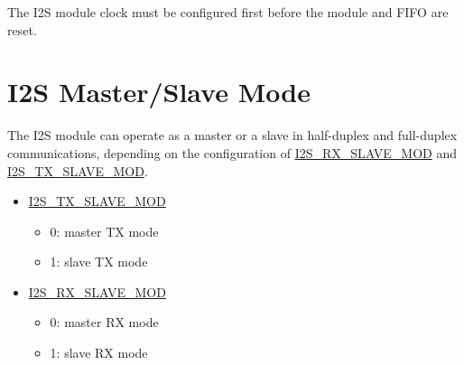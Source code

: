 \documentclass[main\_\_EN.tex]{subfiles}
\begin{document}
\begin{tiplisting}
The I2S module clock must be configured first before the module and FIFO are reset.
\end{tiplisting} 

\section{I2S Master/Slave Mode}

The \chipname{} I2S module can operate as a master or a slave in half-duplex and full-duplex communications, depending on the configuration of  \hyperref[fielddesc:I2SRXSLAVEMOD]{I2S\_RX\_SLAVE\_MOD} and  \hyperref[fielddesc:I2STXSLAVEMOD]{I2S\_TX\_SLAVE\_MOD}.

\begin{itemize}
    \item \hyperref[fielddesc:I2STXSLAVEMOD]{I2S\_TX\_SLAVE\_MOD} 
    \begin{itemize}
        \item 0: master TX mode
        \item 1: slave TX mode
    \end{itemize}
    \item \hyperref[fielddesc:I2SRXSLAVEMOD]{I2S\_RX\_SLAVE\_MOD}
    \begin{itemize}
        \item 0: master RX mode
        \item 1: slave RX mode
    \end{itemize}
\end{itemize}
\end{document}
